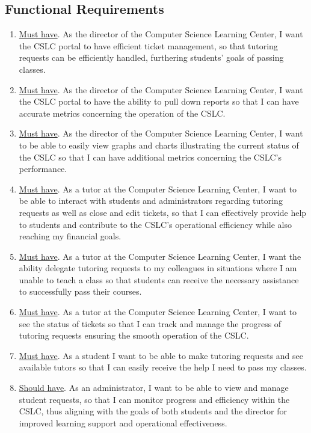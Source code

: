 \documentclass[oneside,openany,obeyspaces]{book}
\begin{document}
\begin{flushleft}
    \section{Functional Requirements} \label{sec:Functional Requirements}

    \begin{enumerate}
        \item \underline{Must have}. As the director of the Computer Science Learning Center, I want the CSLC portal to have efficient ticket management, so that tutoring requests can be efficiently handled, furthering students' goals of passing classes.
        \item \underline{Must have}. As the director of the Computer Science Learning Center, I want the CSLC portal to have the ability to pull down reports so that I can have accurate metrics concerning the operation of the CSLC.
        \item \underline{Must have}. As the director of the Computer Science Learning Center, I want to be able to easily view graphs and charts illustrating the current status of the CSLC so that I can have additional metrics concerning the CSLC's performance.
        \item \underline{Must have}. As a tutor at the Computer Science Learning Center, I want to be able to interact with students and administrators regarding tutoring requests as well as close and edit tickets, so that I can effectively provide help to students and contribute to the CSLC's operational efficiency while also reaching my financial goals.
        \item \underline{Must have}. As a tutor at the Computer Science Learning Center, I want the ability delegate tutoring requests to my colleagues in situations where I am unable to teach a class so that students can receive the necessary assistance to successfully pass their courses.
        \item \underline{Must have}. As a tutor at the Computer Science Learning Center, I want to see the status of tickets so that I can track and manage the progress of tutoring requests ensuring the smooth operation of the CSLC.
        \item \underline{Must have}. As a student I want to be able to make tutoring requests and see available tutors so that I can easily receive the help I need to pass my classes.
        \item \underline{Should have}. As an administrator, I want to be able to view and manage student requests, so that I can monitor progress and efficiency within the CSLC, thus aligning with the goals of both students and the director for improved learning support and operational effectiveness.

\end{enumerate}
\end{flushleft}
\end{document}
